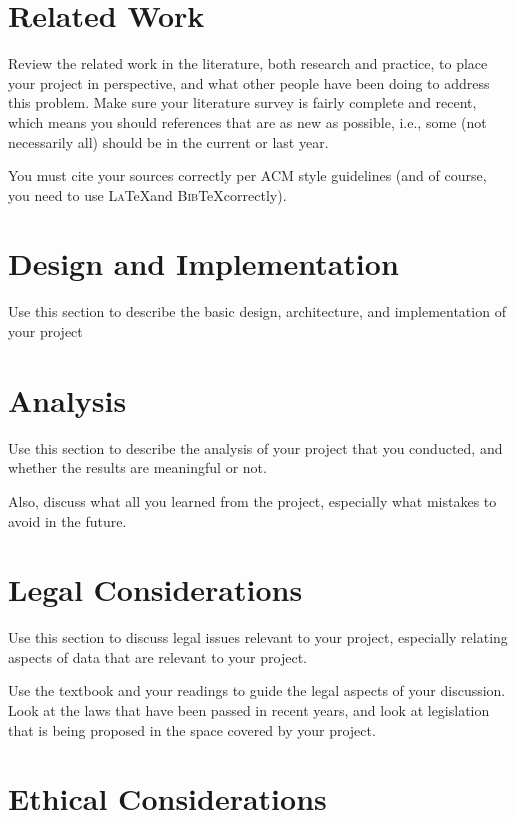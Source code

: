\documentclass[sigconf, anonymous]{acmart}
\def\BibTeX{\textsc{Bib}\TeX}
\def\LaTeX{\textsc{La}\TeX}
\begin{document}
\section{Related Work}
\label{related work}

Review the related work in the literature, both research and practice,
to place your project in perspective, and what other people have been
doing to address this problem. Make sure your literature survey is
fairly complete and recent, which means you should references that are
as new as possible, i.e., some (not necessarily all) should be in the
current or last year.

You must cite your sources correctly per ACM style guidelines (and of
course, you need to use \LaTeX and \BibTeX correctly).

\section{Design and Implementation}
\label{design}

Use this section to describe the basic design, architecture, and
implementation of your project

\section{Analysis}
\label{analysis}
Use this section to describe the analysis of your project that you
conducted, and whether the results are meaningful or not.

Also, discuss what all you learned from the project, especially what
mistakes to avoid in the future.

\section{Legal Considerations}
\label{legal considerations}

Use this section to discuss legal issues relevant to your project,
especially relating aspects of data that are relevant to your project.

Use the textbook and your readings to guide the legal aspects of your
discussion. Look at the laws that have been passed in recent years,
and look at legislation that is being proposed in the space covered by
your project.

\section{Ethical Considerations}
\label{ethical considerations}
\end{document}
